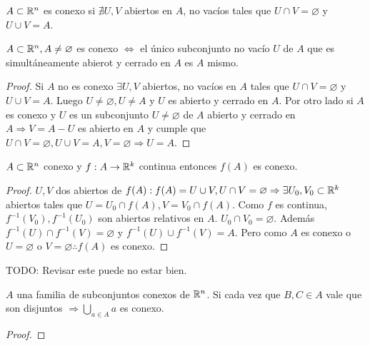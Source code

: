\begin{definition}[Conexo]
  $A \subset \mathbb{R}^n$ es conexo si $\nexists U, V$ abiertos en $A$, no vacíos tales que $U \cap V = \varnothing$ y $U \cup V = A$.
\end{definition}

\begin{prop}
  $A \subset \mathbb{R}^n, A \neq \varnothing$ es conexo $\iff$ el único subconjunto no vacío $U$ de $A$ que es simultáneamente abierot y cerrado en $A$ es $A$ mismo.
  \begin{proof}
    Si $A$ no es conexo $\exists U, V$ abiertos, no vacíos en $A$ tales que $U \cap V = \varnothing$ y $U \cup V = A$. Luego $U \neq \varnothing, U \neq A$ y $U$ es abierto y cerrado en $A$. Por otro lado si $A$ es conexo y $U$ es un subconjunto $U \neq \varnothing$ de $A$ abierto y cerrado en $A \Rightarrow V = A - U$ es abierto en $A$ y cumple que $U \cap V = \varnothing, U \cup V = A, V = \varnothing \Rightarrow U = A$. 
  \end{proof}
\end{prop}

\begin{theorem}
  $A \subset \mathbb{R}^n$ conexo y $f: A \to \mathbb{R}^k$ continua entonces $f(A)$ es conexo.
  \begin{proof}
    $U, V$ dos abiertos de $f(A) : f(A) = U \cup V, U \cap V = \varnothing \Rightarrow \exists U_0, V_0 \subset \mathbb{R}^k$ abiertos tales que $U = U_0 \cap f(A), V = V_0 \cap f(A)$. Como $f$ es continua, $f^{-1}(V_0), f^{-1}(U_0)$ son abiertos relativos en $A$. $U_0 \cap V_0 = \varnothing$. Además $f^{-1}(U) \cap f^{-1}(V) = \varnothing$ y $f^{-1}(U) \cup f^{-1}(V) = A$. Pero como $A$ es conexo o $ U = \varnothing$ o $V = \varnothing \therefore f(A)$ es conexo.
  \end{proof}
\end{theorem}

TODO: Revisar este puede no estar bien. 
\begin{prop}
  $A$ una familia de subconjuntos conexos de $\mathbb{R}^n$. Si cada vez que $B, C \in A$ vale que son disjuntos $\Rightarrow \bigcup_{a \in A} a$ es conexo.
  \begin{proof}

  \end{proof}
\end{prop}
